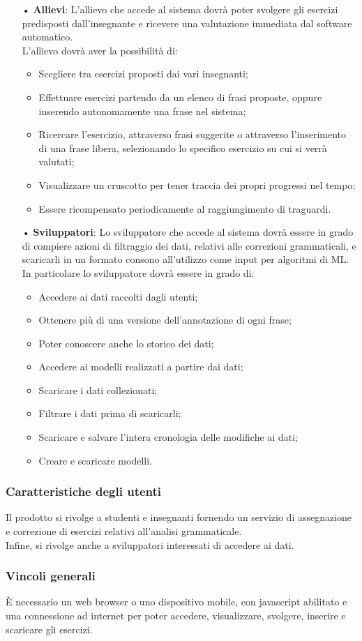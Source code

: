 \begin{itemize}
\item[•]\textbf{Allievi}:
L'allievo che accede al sistema dovrà poter svolgere gli esercizi predisposti dall'insegnante e ricevere una valutazione immediata dal software automatico.\\
L'allievo dovrà aver la possibilità di:
\begin{itemize}
\item Scegliere tra esercizi proposti dai vari insegnanti;
\item Effettuare esercizi partendo da un elenco di frasi proposte, oppure inserendo autonomamente una frase nel sistema;
\item Ricercare l'esercizio, attraverso frasi suggerite o attraverso l'inserimento di una frase libera, selezionando lo specifico esercizio su cui si verrà valutati; 
\item Visualizzare un {cruscotto} per tener traccia dei propri progressi nel tempo;
\item Essere ricompensato periodicamente al raggiungimento di traguardi.
\end{itemize}
\item[•]\textbf{Sviluppatori}:
Lo sviluppatore che accede al sistema dovrà essere in grado di compiere azioni di filtraggio dei dati, relativi alle correzioni grammaticali, e scaricarli in un formato consono all'utilizzo come input per algoritmi di {ML}. \\
In particolare lo sviluppatore dovrà essere in grado di:
\begin{itemize}
\item Accedere ai dati raccolti dagli utenti;
\item Ottenere più di una versione dell'annotazione di ogni frase;
\item Poter conoscere anche lo storico dei dati;
\item Accedere ai modelli realizzati a partire dai dati;
\item Scaricare i dati collezionati;
\item Filtrare i dati prima di scaricarli;
\item Scaricare e salvare l'intera cronologia delle modifiche ai dati;
\item Creare e scaricare modelli.
\end{itemize}
\end{itemize}
\subsubsection{Caratteristiche degli utenti}
Il prodotto si rivolge a studenti e insegnanti fornendo un servizio di assegnazione e correzione di esercizi relativi all'analisi grammaticale. \\ Infine, si rivolge anche a sviluppatori interessati di accedere ai dati.
\subsubsection{Vincoli generali}
\uppercase{è} necessario un web browser o uno dispositivo mobile, con javascript abilitato e una connessione ad internet per poter accedere, visualizzare, svolgere, inserire e scaricare gli esercizi.


